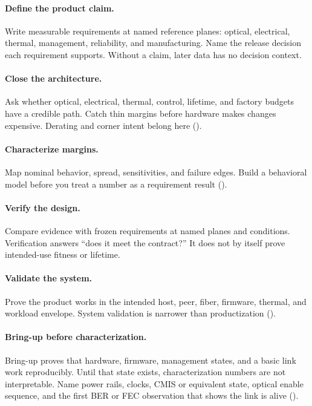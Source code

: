 \paragraph{Define the product claim.}
Write measurable requirements at named reference planes: optical, electrical,
thermal, management, reliability, and manufacturing. Name the release decision
each requirement supports. Without a claim, later data has no decision context.

\paragraph{Close the architecture.}
Ask whether optical, electrical, thermal, control, lifetime, and factory
budgets have a credible path. Catch thin margins before hardware makes changes
expensive. Derating and corner intent belong here
().

\paragraph{Characterize margins.}
Map nominal behavior, spread, sensitivities, and failure edges. Build a
behavioral model before you treat a number as a requirement result
().

\paragraph{Verify the design.}
Compare evidence with frozen requirements at named planes and conditions.
Verification answers ``does it meet the contract?'' It does not by itself prove
intended-use fitness or lifetime.

\paragraph{Validate the system.}
Prove the product works in the intended host, peer, fiber, firmware, thermal,
and workload envelope. System validation is narrower than productization
().

\paragraph{Bring-up before characterization.}
Bring-up proves that hardware, firmware, management states, and a basic link
work reproducibly. Until that state exists, characterization numbers are not
interpretable. Name power rails, clocks, CMIS or equivalent state, optical
enable sequence, and the first BER or FEC observation that shows the link is
alive ().

